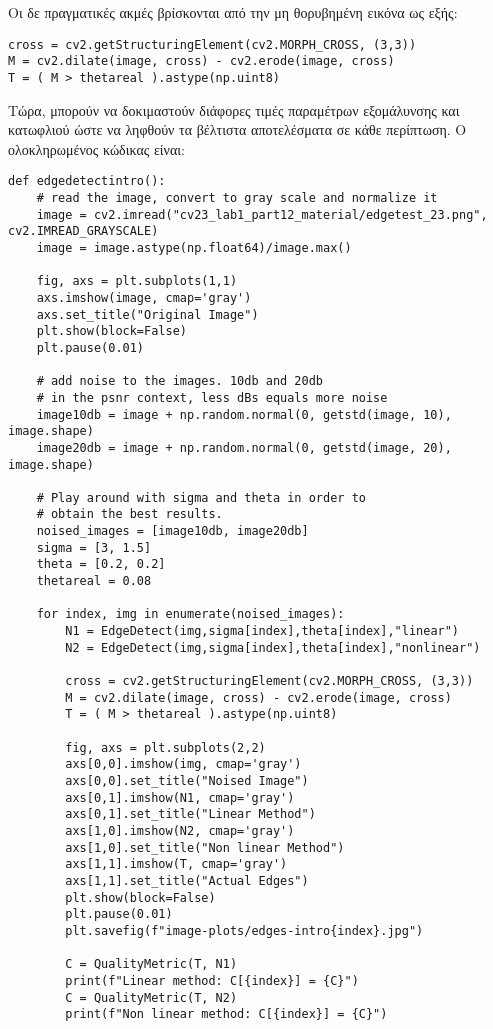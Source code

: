 \documentclass{article}
\begin{document}
Οι δε πραγματικές ακμές βρίσκονται από την μη θορυβημένη εικόνα ως εξής:

\begin{lstlisting}[breaklines=true, showstringspaces=false]
cross = cv2.getStructuringElement(cv2.MORPH_CROSS, (3,3))
M = cv2.dilate(image, cross) - cv2.erode(image, cross)
T = ( M > thetareal ).astype(np.uint8)
\end{lstlisting}

Τώρα, μπορούν να δοκιμαστούν διάφορες τιμές παραμέτρων εξομάλυνσης και κατωφλιού ώστε να ληφθούν τα βέλτιστα αποτελέσματα σε κάθε περίπτωση. Ο ολοκληρωμένος κώδικας είναι:

\begin{lstlisting}[breaklines=true, showstringspaces=false]
def edgedetectintro():
    # read the image, convert to gray scale and normalize it
    image = cv2.imread("cv23_lab1_part12_material/edgetest_23.png", cv2.IMREAD_GRAYSCALE)
    image = image.astype(np.float64)/image.max()

    fig, axs = plt.subplots(1,1)
    axs.imshow(image, cmap='gray')
    axs.set_title("Original Image")
    plt.show(block=False)
    plt.pause(0.01)

    # add noise to the images. 10db and 20db
    # in the psnr context, less dBs equals more noise
    image10db = image + np.random.normal(0, getstd(image, 10), image.shape)
    image20db = image + np.random.normal(0, getstd(image, 20), image.shape)

    # Play around with sigma and theta in order to
    # obtain the best results. 
    noised_images = [image10db, image20db]
    sigma = [3, 1.5]
    theta = [0.2, 0.2]
    thetareal = 0.08

    for index, img in enumerate(noised_images):
        N1 = EdgeDetect(img,sigma[index],theta[index],"linear")
        N2 = EdgeDetect(img,sigma[index],theta[index],"nonlinear")

        cross = cv2.getStructuringElement(cv2.MORPH_CROSS, (3,3))
        M = cv2.dilate(image, cross) - cv2.erode(image, cross)
        T = ( M > thetareal ).astype(np.uint8)

        fig, axs = plt.subplots(2,2)
        axs[0,0].imshow(img, cmap='gray')
        axs[0,0].set_title("Noised Image")
        axs[0,1].imshow(N1, cmap='gray')
        axs[0,1].set_title("Linear Method")
        axs[1,0].imshow(N2, cmap='gray')
        axs[1,0].set_title("Non linear Method")
        axs[1,1].imshow(T, cmap='gray')
        axs[1,1].set_title("Actual Edges")
        plt.show(block=False)
        plt.pause(0.01)
        plt.savefig(f"image-plots/edges-intro{index}.jpg")

        C = QualityMetric(T, N1)
        print(f"Linear method: C[{index}] = {C}")
        C = QualityMetric(T, N2)
        print(f"Non linear method: C[{index}] = {C}")
\end{lstlisting}
\end{document}
